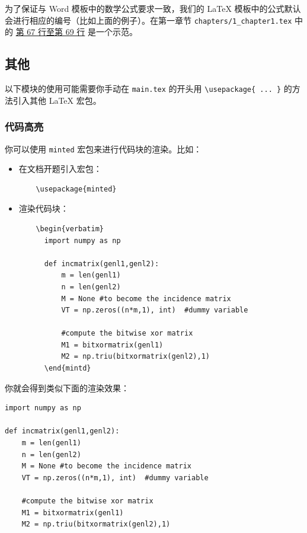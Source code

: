 为了保证与 Word 模板中的数学公式要求一致，我们的 {\LaTeX} 模板中的公式默认会进行相应的编号（比如上面的例子）。在第一章节 \texttt{chapters/1\_chapter1.tex} 中的 \href{https://github.com/spencerwooo/BIThesis/blob/master/graduation-thesis/chapters/1_chapter1.tex#L67-L69}{第 67 行至第 69 行} 是一个示范。

\subsection{其他}

以下模块的使用可能需要你手动在 \texttt{main.tex} 的开头用 \verb|\usepackage{ ... }| 的方法引入其他 {\LaTeX} 宏包。

\subsubsection{代码高亮}

你可以使用 \texttt{minted} 宏包来进行代码块的渲染。比如：

\begin{itemize}
  \item 在文档开题引入宏包：
  \begin{verbatim}
    \usepackage{minted}
  \end{verbatim}
  \item 渲染代码块：
  \begin{verbatim}
    \begin{verbatim}
      import numpy as np

      def incmatrix(genl1,genl2):
          m = len(genl1)
          n = len(genl2)
          M = None #to become the incidence matrix
          VT = np.zeros((n*m,1), int)  #dummy variable

          #compute the bitwise xor matrix
          M1 = bitxormatrix(genl1)
          M2 = np.triu(bitxormatrix(genl2),1)
      \end{mintd}
  \end{verbatim}
\end{itemize}

你就会得到类似下面的渲染效果：

\begin{verbatim}
import numpy as np

def incmatrix(genl1,genl2):
    m = len(genl1)
    n = len(genl2)
    M = None #to become the incidence matrix
    VT = np.zeros((n*m,1), int)  #dummy variable

    #compute the bitwise xor matrix
    M1 = bitxormatrix(genl1)
    M2 = np.triu(bitxormatrix(genl2),1)
\end{verbatim}

